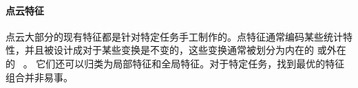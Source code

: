 \paragraph{点云特征}
点云大部分的现有特征都是针对特定任务手工制作的。点特征通常编码某些统计特性，并且被设计成对于某些变换是不变的，这些变换通常被划分为内在的
\cite{aubry2011wave, sun2009concise, bronstein2010scale} 或外在的 ~\cite{rusu2008aligning, rusu2009fast, ling2007shape, johnson1999using, chen2003visual}。  它们还可以归类为局部特征和全局特征。对于特定任务，找到最优的特征组合并非易事。






